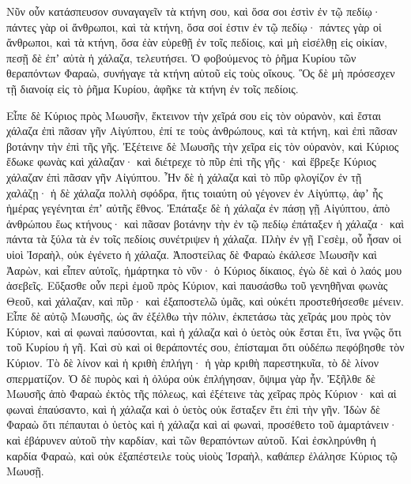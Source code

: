 {Νῦν οὖν κατάσπευσον συναγαγεῖν τὰ κτήνη σου, καὶ ὅσα σοι ἐστὶν ἐν τῷ πεδίῳ· πάντες γὰρ οἱ ἄνθρωποι, καὶ τὰ κτήνη, ὅσα σοί ἐστιν ἐν τῷ πεδίῳ· πάντες γὰρ οἱ ἄνθρωποι, καὶ τὰ κτήνη, ὅσα ἐὰν εὑρεθῇ ἐν τοῖς πεδίοις, καὶ μὴ εἰσέλθῃ εἰς οἰκίαν, πεσῇ δὲ ἐπʼ αὐτὰ ἡ χάλαζα, τελευτήσει.
Ὁ φοβούμενος τὸ ῥῆμα Κυρίου τῶν θεραπόντων Φαραὼ, συνήγαγε τὰ κτήνη αὐτοῦ εἰς τοὺς οἴκους.
Ὃς δὲ μὴ πρόσεσχεν τῇ διανοίᾳ εἰς τὸ ῥῆμα Κυρίου, ἀφῆκε τὰ κτήνη ἐν τοῖς πεδίοις.
\par }{\PP {}Εἶπε δὲ Κύριος πρὸς Μωυσῆν, ἔκτεινον τὴν χεῖρά σου εἰς τὸν οὐρανὸν, καὶ ἔσται χάλαζα ἐπὶ πᾶσαν γῆν Αἰγύπτου, ἐπί τε τοὺς ἀνθρώπους, καὶ τὰ κτήνη, καὶ ἐπὶ πᾶσαν βοτάνην τὴν ἐπὶ τῆς γῆς.
Ἐξέτεινε δὲ Μωυσῆς τὴν χεῖρα εἰς τὸν οὐρανὸν, καὶ Κύριος ἔδωκε φωνὰς καὶ χάλαζαν· καὶ διέτρεχε τὸ πῦρ ἐπὶ τῆς γῆς· καὶ ἔβρεξε Κύριος χάλαζαν ἐπὶ πᾶσαν γῆν Αἰγύπτου.
Ἦν δὲ ἡ χάλαζα καὶ τὸ πῦρ φλογίζον ἐν τῇ χαλάζῃ· ἡ δὲ χάλαζα πολλὴ σφόδρα, ἥτις τοιαύτη οὐ γέγονεν ἐν Αἰγύπτῳ, ἀφʼ ἧς ἡμέρας γεγένηται ἐπʼ αὐτῆς ἔθνος.
Ἐπάταξε δὲ ἡ χάλαζα ἐν πάσῃ γῇ Αἰγύπτου, ἀπὸ ἀνθρώπου ἕως κτήνους· καὶ πᾶσαν βοτάνην τὴν ἐν τῷ πεδίῳ ἐπάταξεν ἡ χάλαζα· καὶ πάντα τὰ ξύλα τὰ ἐν τοῖς πεδίοις συνέτριψεν ἡ χάλαζα.
Πλὴν ἐν γῇ Γεσὲμ, οὗ ἦσαν οἱ υἱοὶ Ἰσραὴλ, οὐκ ἐγένετο ἡ χάλαζα.
Ἀποστείλας δὲ Φαραὼ ἐκάλεσε Μωυσῆν καὶ Ἀαρὼν, καὶ εἶπεν αὐτοῖς, ἡμάρτηκα τὸ νῦν· ὁ Κύριος δίκαιος, ἐγὼ δὲ καὶ ὁ λαός μου ἀσεβεῖς.
Εὔξασθε οὖν περὶ ἐμοῦ πρὸς Κύριον, καὶ παυσάσθω τοῦ γενηθῆναι φωνὰς Θεοῦ, καὶ χάλαζαν, καὶ πῦρ· καὶ ἐξαποστελῶ ὑμᾶς, καὶ οὐκέτι προστεθήσεσθε μένειν.
Εἶπε δὲ αὐτῷ Μωυσῆς, ὡς ἂν ἐξέλθω τὴν πόλιν, ἐκπετάσω τὰς χεῖράς μου πρὸς τὸν Κύριον, καὶ αἱ φωναὶ παύσονται, καὶ ἡ χάλαζα καὶ ὁ ὑετὸς οὐκ ἔσται ἔτι, ἵνα γνῷς ὅτι τοῦ Κυρίου ἡ γῆ.
Καὶ σὺ καὶ οἱ θεράποντές σου, ἐπίσταμαι ὅτι οὐδέπω πεφόβησθε τὸν Κύριον.
Τὸ δὲ λίνον καὶ ἡ κριθὴ ἐπλήγη· ἡ γὰρ κριθὴ παρεστηκυῖα, τὸ δὲ λίνον σπερματίζον.
Ὁ δὲ πυρὸς καὶ ἡ ὀλύρα οὐκ ἐπλήγησαν, ὄψιμα γὰρ ἦν.
Ἐξῆλθε δὲ Μωυσῆς ἀπὸ Φαραὼ ἐκτὸς τῆς πόλεως, καὶ ἐξέτεινε τὰς χεῖρας πρὸς Κύριον· καὶ αἱ φωναὶ ἐπαύσαντο, καὶ ἡ χάλαζα καὶ ὁ ὑετὸς οὐκ ἔσταξεν ἔτι ἐπὶ τὴν γῆν.
Ἰδὼν δὲ Φαραὼ ὅτι πέπαυται ὁ ὑετὸς καὶ ἡ χάλαζα καὶ αἱ φωναὶ, προσέθετο τοῦ ἁμαρτάνειν· καὶ ἐβάρυνεν αὐτοῦ τὴν καρδίαν, καὶ τῶν θεραπόντων αὐτοῦ.
Καὶ ἐσκληρύνθη ἡ καρδία Φαραὼ, καὶ οὐκ ἐξαπέστειλε τοὺς υἱοὺς Ἰσραὴλ, καθάπερ ἐλάλησε Κύριος τῷ Μωυσῇ.

}
